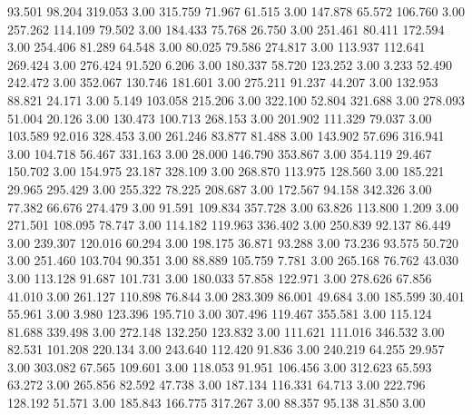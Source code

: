   93.501   98.204  319.053         3.00
 315.759   71.967   61.515         3.00
 147.878   65.572  106.760         3.00
 257.262  114.109   79.502         3.00
 184.433   75.768   26.750         3.00
 251.461   80.411  172.594         3.00
 254.406   81.289   64.548         3.00
  80.025   79.586  274.817         3.00
 113.937  112.641  269.424         3.00
 276.424   91.520    6.206         3.00
 180.337   58.720  123.252         3.00
   3.233   52.490  242.472         3.00
 352.067  130.746  181.601         3.00
 275.211   91.237   44.207         3.00
 132.953   88.821   24.171         3.00
   5.149  103.058  215.206         3.00
 322.100   52.804  321.688         3.00
 278.093   51.004   20.126         3.00
 130.473  100.713  268.153         3.00
 201.902  111.329   79.037         3.00
 103.589   92.016  328.453         3.00
 261.246   83.877   81.488         3.00
 143.902   57.696  316.941         3.00
 104.718   56.467  331.163         3.00
  28.000  146.790  353.867         3.00
 354.119   29.467  150.702         3.00
 154.975   23.187  328.109         3.00
 268.870  113.975  128.560         3.00
 185.221   29.965  295.429         3.00
 255.322   78.225  208.687         3.00
 172.567   94.158  342.326         3.00
  77.382   66.676  274.479         3.00
  91.591  109.834  357.728         3.00
  63.826  113.800    1.209         3.00
 271.501  108.095   78.747         3.00
 114.182  119.963  336.402         3.00
 250.839   92.137   86.449         3.00
 239.307  120.016   60.294         3.00
 198.175   36.871   93.288         3.00
  73.236   93.575   50.720         3.00
 251.460  103.704   90.351         3.00
  88.889  105.759    7.781         3.00
 265.168   76.762   43.030         3.00
 113.128   91.687  101.731         3.00
 180.033   57.858  122.971         3.00
 278.626   67.856   41.010         3.00
 261.127  110.898   76.844         3.00
 283.309   86.001   49.684         3.00
 185.599   30.401   55.961         3.00
   3.980  123.396  195.710         3.00
 307.496  119.467  355.581         3.00
 115.124   81.688  339.498         3.00
 272.148  132.250  123.832         3.00
 111.621  111.016  346.532         3.00
  82.531  101.208  220.134         3.00
 243.640  112.420   91.836         3.00
 240.219   64.255   29.957         3.00
 303.082   67.565  109.601         3.00
 118.053   91.951  106.456         3.00
 312.623   65.593   63.272         3.00
 265.856   82.592   47.738         3.00
 187.134  116.331   64.713         3.00
 222.796  128.192   51.571         3.00
 185.843  166.775  317.267         3.00
  88.357   95.138   31.850         3.00
